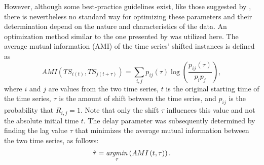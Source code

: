 However, although some best-practice guidelines exist, like those suggested by \citet{Coco2014crqa-r}, there is nevertheless no standard way for optimizing these parameters and their determination depend on the nature and characteristics of the data.
An optimization method similar to the one presented by \citet{Marwan2007recurrence} was utilized here.
The average mutual information (AMI) of the time series' shifted instances is defined as 
\begin{equation}
	\label{eq:average_mutual_information}
	AMI\left( TS_{i(t)}, TS_{j(t + \tau)} \right) = \sum_{i,j} p_{ij} (\tau) \log \left( \frac{p_{ij} \left( \tau \right)}{p_i p_j} \right),
\end{equation}
\noindent
%
where $i$ and $j$ are values from the two time series, $t$ is the original starting time of the time series, $\tau$ is the amount of shift between the time series, and $p_{ij}$ is the probability that $R_{i, j} = 1$.
Note that only the shift $\tau$ influences this value and not the absolute initial time $t$.
The delay parameter was subsequently determined by finding the lag value $\tau$ that minimizes the average mutual information between the two time series, as follows:
%
\begin{equation}
	\label{eq:delay_opt}
	\hat{\tau} = \operatorname*{\mathit{argmin}}_{\tau} \left( AMI\left( t, \tau \right) \right).
\end{equation}
\noindent
%
%
\addtocounter{equation}{1}
